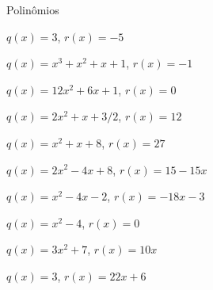 \begin{exercicios}{Polinômios}
\begin{exercicio}
\begin{answers}
\begin{alphalist}
                \item $q(x) = 3                     $, $r(x) = -5$
                \item $q(x) = x^3 + x^2 + x + 1     $, $r(x) = -1$
                \item $q(x) = 12x^2 + 6x + 1        $, $r(x) = 0$
                \item $q(x) = 2x^2 + x + 3/2        $, $r(x) = 12$
                \item $q(x) = x^2 + x + 8           $, $r(x) = 27$
                \item $q(x) = 2x^2 - 4x + 8         $, $r(x) = 15 - 15x$
                \item $q(x) = x^2 - 4x - 2          $, $r(x) = -18x - 3$
                \item $q(x) = x^2 - 4               $, $r(x) = 0$
                \item $q(x) = 3x^2 + 7              $, $r(x) = 10x$
                \item $q(x) = 3                     $, $r(x) = 22x + 6$
            \end{alphalist}
        \end{answers}
    \end{exercicio}
    

\end{exercicios}
